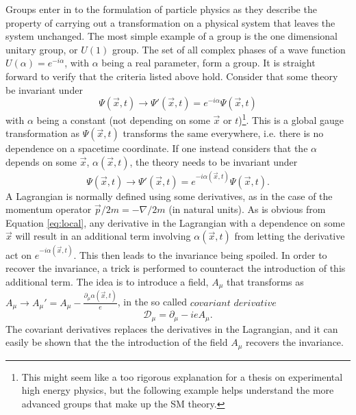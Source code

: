 Groups enter in to the formulation of particle physics as they describe the property of carrying out a transformation on a physical system that leaves the system unchanged. 
The most simple example of a group is the one dimensional unitary group, or $U(1)$ group. 
The set of all complex phases of a wave function $U(\alpha)=e^{-i\alpha}$, with $\alpha$ being a real parameter, form a group.
It is straight forward to verify that the criteria listed above hold. 
Consider that some theory be invariant under 
\begin{equation}
\Psi(\vec{x},t)\rightarrow \Psi'(\vec{x},t)=e^{-i\alpha}\Psi(\vec{x},t)
\end{equation}                                                         
with $\alpha$ being a constant (not depending on some $\vec{x}$ or $t$)\footnote{This might seem like a too rigorous explanation for a thesis on experimental high energy physics, but the following example helps understand the more advanced groups that make up the SM theory.}. 
This is a global gauge transformation as $\Psi(\vec{x},t)$ transforms the same everywhere, i.e. there is no dependence on a spacetime coordinate.  
If one instead considers that the $\alpha$ depends on some $\vec{x}$, $\alpha(\vec{x},t)$, the theory needs to be invariant under 
\begin{equation}
\Psi(\vec{x},t)\rightarrow \Psi'(\vec{x},t)=e^{-i\alpha(\vec{x},t)}\Psi(\vec{x},t). 
\label{eq:local}
\end{equation}                                                         
A Lagrangian is normally defined using some derivatives, as in the case of the momentum operator $\vec{p}/2m=-\nabla/2m$ (in natural units). 
As is obvious from Equation \ref{eq:local}, any derivative in the Lagrangian with a dependence on some $\vec{x}$ will result in an additional term involving $\alpha(\vec{x},t)$ from letting the derivative act on $e^{-i\alpha(\vec{x},t)}$. This then leads to the invariance being spoiled. 
In order to recover the invariance, a trick is performed to counteract the introduction of this additional term. 
The idea is to introduce a field, $A_{\mu}$ that transforms as $A_{\mu}\rightarrow A_{\mu}'=A_{\mu}-\frac{\partial_{\mu}\alpha(\vec{x},t)}{e}$, in the so called $covariant$ $derivative$
\begin{equation}
\mathcal{D}_{\mu}=\partial_{\mu}-ieA_{\mu}.
\end{equation}                                                         
The covariant derivatives replaces the derivatives in the Lagrangian, and it can easily be shown that the the introduction of the field $A_{\mu}$ recovers the invariance. 

